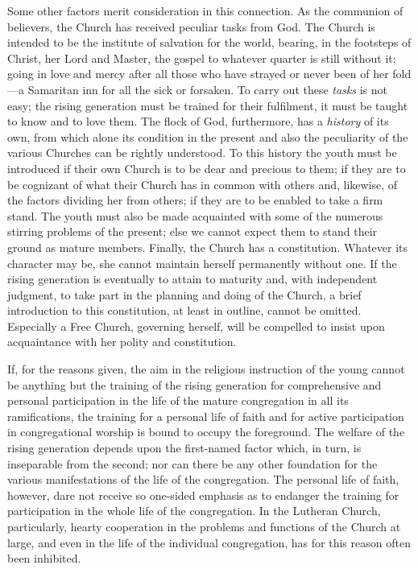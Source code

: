 Some other factors merit consideration in this connection. As the communion of believers, the Church has received peculiar tasks from God. The Church is intended to be the institute of salvation for the world, bearing, in the footsteps of Christ, her Lord and Master, the gospel to whatever quarter is still without it; going in love and mercy after all those who have strayed or never been of her fold—a Samaritan inn for all the sick or forsaken. To carry out these \emph{tasks} is not easy; the rising generation must be trained for their fulfilment, it must be taught to know and to love them. The flock of God, furthermore, has a \emph{history} of its own, from which alone its condition in the present and also the peculiarity of the various Churches can be rightly understood. To this history the youth must be introduced
if their own Church is to be dear and precious to them; if they are to be cognizant of what their Church has in common with others and, likewise, of the factors dividing her from others; if they are to be enabled to take a firm stand. The youth must also be made acquainted with some of the numerous stirring problems of the present; else we cannot expect them to stand their ground as mature members. Finally, the Church has a constitution. Whatever its character may be, she cannot maintain herself permanently without one. If the rising generation is eventually to attain to maturity and, with independent judgment, to take part in the planning and doing of the Church, a brief introduction to this constitution, at least in outline, cannot be omitted. Especially a Free Church, governing herself, will be compelled to insist upon acquaintance with her polity and constitution.

If, for the reasons given, the aim in the religious instruction of the young cannot be anything but the training of the rising generation for comprehensive and personal participation in the life of the mature congregation in all its ramifications, the training for a personal life of faith and for active participation in congregational worship is bound to occupy the foreground. The welfare of the rising generation depends upon the first-named factor which, in turn, is inseparable from the second; nor can there be any other foundation for the various manifestations of the life of the congregation. The personal life of faith, however, dare not receive so one-sided emphasis as to endanger the training for participation in the whole life of the congregation. In the Lutheran Church, particularly, hearty cooperation in the problems and functions of the Church at large, and even in the life of the individual congregation, has for this reason often been inhibited.

